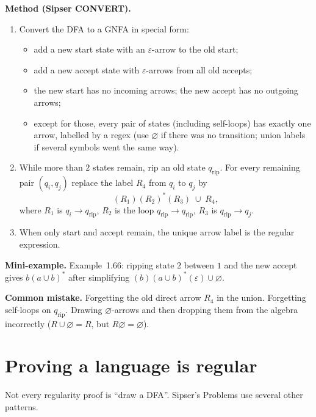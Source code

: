 \documentclass[11pt,a4paper]{article}
\newcommand{\eps}{\varepsilon}
\begin{document}
\textbf{Method (Sipser CONVERT).}
\begin{enumerate}
  \item Convert the DFA to a GNFA in special form:
        \begin{itemize}[nosep]
          \item add a new start state with an $\eps$-arrow to the old
                start;
          \item add a new accept state with $\eps$-arrows from all old
                accepts;
          \item the new start has no incoming arrows; the new accept
                has no outgoing arrows;
          \item except for those, every pair of states (including
                self-loops) has exactly one arrow, labelled by a regex
                (use $\varnothing$ if there was no transition; union
                labels if several symbols went the same way).
        \end{itemize}
  \item While more than $2$ states remain, rip an old state
        $q_{\mathrm{rip}}$. For every remaining pair $(q_i,q_j)$ replace
        the label $R_4$ from $q_i$ to $q_j$ by
        \[
          (R_1)(R_2)^*(R_3)\;\cup\; R_4,
        \]
        where $R_1$ is $q_i\to q_{\mathrm{rip}}$, $R_2$ is the loop
        $q_{\mathrm{rip}}\to q_{\mathrm{rip}}$, $R_3$ is
        $q_{\mathrm{rip}}\to q_j$.
  \item When only start and accept remain, the unique arrow label is
        the regular expression.
\end{enumerate}

\textbf{Mini-example.}
Example~1.66: ripping state $2$ between $1$ and the new accept gives
$b(a\cup b)^*$ after simplifying
$(b)(a\cup b)^*(\eps)\cup\varnothing$.

\textbf{Common mistake.}
Forgetting the old direct arrow $R_4$ in the union. Forgetting
self-loops on $q_{\mathrm{rip}}$. Drawing $\varnothing$-arrows and then
dropping them from the algebra incorrectly
($R\cup\varnothing=R$, but $R\varnothing=\varnothing$).

\section{Proving a language is regular}
\label{type:show-regular}

Not every regularity proof is ``draw a DFA''. Sipser's Problems use
several other patterns.
\end{document}
